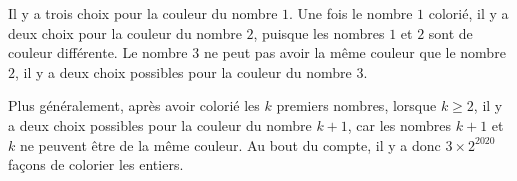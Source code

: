 Il y a trois choix pour la couleur du nombre $1$. Une fois le nombre $1$ colorié, il y a deux choix pour la couleur du nombre $2$, puisque les nombres $1$ et $2$ sont de couleur différente. Le nombre $3$ ne peut pas avoir la même couleur que le nombre $2$, il y a deux choix possibles pour la couleur du nombre $3$.

Plus généralement, après avoir colorié les $k$ premiers nombres, lorsque $k\ge 2$, il y a deux choix possibles pour
la couleur du nombre $k+1$, car les nombres $k+1$ et $k$ ne peuvent être de la même couleur.
Au bout du compte, il y a donc $3 \times 2^{2020}$ façons de colorier les entiers.